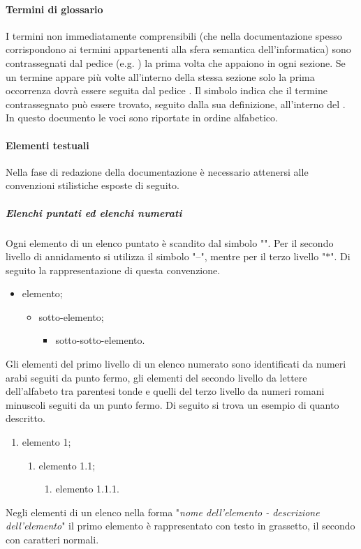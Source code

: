 \paragraph{Termini di glossario}
I termini non immediatamente comprensibili (che nella documentazione spesso corrispondono ai termini appartenenti alla sfera semantica dell'informatica) sono contrassegnati dal pedice \glock{} (e.g. ) la prima volta che appaiono in ogni sezione. Se un termine appare più volte all'interno della stessa sezione solo la prima occorrenza dovrà essere seguita dal pedice \glock{}. Il simbolo indica che il termine contrassegnato può essere trovato, seguito dalla sua definizione, all'interno del . In questo documento le voci sono riportate in ordine alfabetico.

\paragraph{Elementi testuali}
Nella fase di redazione della documentazione è necessario attenersi alle convenzioni stilistiche esposte di seguito.

\subparagraph{Elenchi puntati ed elenchi numerati}
Ogni elemento di un elenco puntato è scandito dal simbolo "\textbullet". Per il secondo livello di annidamento si utilizza il simbolo "--", mentre per il terzo livello "$\ast$". Di seguito la rappresentazione di questa convenzione.
\begin{itemize}
    \item elemento;
          \begin{itemize}
              \item sotto-elemento;
                    \begin{itemize}
                        \item sotto-sotto-elemento.
                    \end{itemize}
          \end{itemize}
\end{itemize}
Gli elementi del primo livello di un elenco numerato sono identificati da numeri arabi seguiti da punto fermo, gli elementi del secondo livello da lettere dell'alfabeto tra parentesi tonde e quelli del terzo livello da numeri romani minuscoli seguiti da  un punto fermo. Di seguito si trova un esempio di quanto descritto.
\begin{enumerate}
    \item elemento 1;
          \begin{enumerate}
              \item elemento 1.1;
                    \begin{enumerate}
                        \item elemento 1.1.1.
                    \end{enumerate}
          \end{enumerate}
\end{enumerate}
Negli elementi di un elenco nella forma "\textit{nome dell'elemento - descrizione dell'elemento}"  il primo elemento è rappresentato con testo in grassetto, il secondo con caratteri normali.

